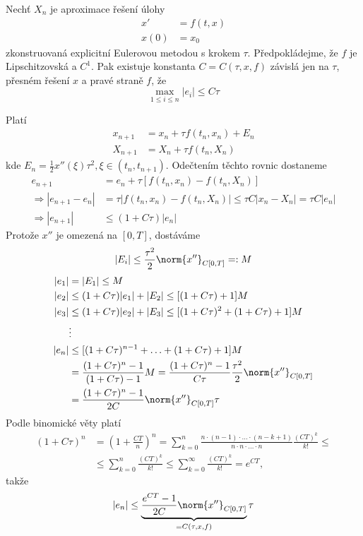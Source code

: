 \begin{věta}
  Nechť $X_n$ je aproximace řešení úlohy
  \begin{align*}
    x' &= f(t,x) \\
    x(0) &= x_0
  \end{align*}
zkonstruovaná explicitní Eulerovou metodou s krokem $\tau$. Předpokládejme, že $f$ je Lipschitzovská a $C^{1}$. Pak existuje konstanta $C=C(\tau,x,f)$ závislá jen na $\tau$, přesném řešení $x$ a pravé straně $f$, že
\begin{equation*}
	\max_{1\leq i\leq n}|e_i| \leq C\tau
\end{equation*}
\end{věta}
\begin{důkaz}
Platí
\begin{align*}
	x_{n+1}	&=x_n+\tau f(t_n,x_n)+E_n \\
	X_{n+1}	&= X_n+\tau f(t_n,X_n)
\end{align*}
kde $E_n=\frac{1}{2}x''(\xi)\tau^{2}, \xi\in(t_n,t_{n+1}).$ Odečtením těchto rovnic dostaneme
\begin{align*}
	e_{n+1} &= e_n+\tau [f(t_n,x_n)-f(t_n,X_n)] \\
	\Rightarrow  |e_{n+1}-e_n| &= \tau |f(t_n,x_n)-f(t_n,X_n)| \leq \tau C|x_n-X_n|=\tau C |e_n| \\
	\Rightarrow |e_{n+1}| &\leq (1+C\tau)|e_n|
\end{align*}
Protože $x''$ je omezená na $[0,T]$, dostáváme
\begin{equation*}
	|E_i|\leq \frac{\tau^{2}}{2}\norm{x''}_{C[0,T]}=:M
\end{equation*}
\begin{align*}
	|e_1|&=|E_1|\leq M \\
	|e_2|&\leq (1+C\tau)|e_1|+|E_2| \leq [(1+C\tau)+1]M \\
	|e_3|&\leq (1+C\tau)|e_2|+|E_3| \leq [(1+C\tau)^{2}+(1+C\tau)+1]M \\
	     &\vdots \\
	|e_n|&\leq [(1+C\tau)^{n-1}+\hdots+(1+C\tau)+1]M \\
	     &= \frac{(1+C\tau)^{n}-1}{(1+C\tau)-1}M= \frac{(1+C\tau)^{n}-1}{C\tau}\frac{\tau^{2}}{2}\norm{x''}_{C[0,T]} \\
	     &= \frac{(1+C\tau)^{n}-1}{2C}\norm{x''}_{C[0,T]}\tau
\end{align*}
Podle binomické věty platí
\begin{align*}
	\left(1+C\tau\right)^{n}&=\left(1+\frac{CT}{n}\right)^n = \sum_{k=0}^n \frac{n\cdot(n-1)\cdot\hdots\cdot (n-k+1)}{n\cdot n\cdot \hdots \cdot n}\frac{(CT)^{k}}{k!}\leq \\
	&\leq\sum_{k=0}^n \frac{(CT)^{k}}{k!} \leq \sum_{k=0}^\infty \frac{(CT)^{k}}{k!}=e^{CT},
\end{align*}
takže
\begin{equation*}
	|e_n|\leq \underbrace{\frac{e^{CT}-1}{2C}\norm{x''}_{C[0,T]}}_{=C(\tau,x,f)}\tau
\end{equation*}
\end{důkaz}

